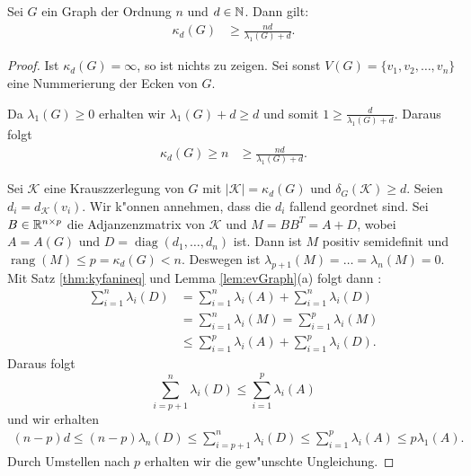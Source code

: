 \begin{theorem}
  Sei $G$ ein Graph der Ordnung $n$ und $d\in {\mathbb{N}}$. Dann gilt:
  \begin{align*}
    \kappa_{d}(G) &\geq \frac{nd}{\lambda_{1}(G) +d}.
  \end{align*}
  \label{thm:kappaineq1}
\end{theorem}

\begin{proof}
  Ist $\kappa_{d}(G) = \infty$, so ist nichts zu zeigen. Sei sonst $V(G) = \{v_1,v_2,\dots, v_n\}$ eine Nummerierung der Ecken von $G$.  

   Da $\lambda_{1}(G) \geq 0$ erhalten wir $\lambda_{1}(G) + d \geq d$ und somit $1\geq \frac{d}{\lambda_{1}(G) +d}$. Daraus folgt 
  \begin{align*}
    \kappa_{d}(G) \geq n &\geq \frac{nd}{\lambda_{1}(G)+d}.
  \end{align*}

  Sei $\mathcal{K}$ eine Krauszzerlegung von $G$ mit $|\mathcal{K}| = \kappa_{d}(G)$ und $\delta_{G}(\mathcal{K}) \geq d$. Seien $d_{i} = d_{\mathcal{K}}(v_i)$. Wir k"onnen annehmen, dass die $d_{i}$ fallend geordnet sind. Sei $B\in {\mathbb{R}}^{n\times p}$ die Adjanzenzmatrix von $\mathcal{K}$ und $M = BB^{T} = A+D$, wobei $A= A(G)$ und $D = \operatorname{diag}(d_{1},\dots,d_n)$ ist.
  Dann ist $M$ positiv semidefinit und $\operatorname{rang} (M) \leq p = \kappa_{d}(G) < n $. Deswegen ist $\lambda_{p+1}(M) = \dots =\lambda_{n}(M) = 0$. 
  Mit Satz \ref{thm:kyfanineq} und Lemma \ref{lem:evGraph}(a) folgt dann : 
  \begin{align*}
    \sum\limits_{i=1}^{n} \lambda_{i}(D) &=\sum\limits_{i=1}^{n} \lambda_{i}(A) +\sum\limits_{i=1}^{n}  \lambda_{i}(D) \\
    &=\sum\limits_{i=1}^{n} \lambda_{i}(M) =\sum\limits_{i=1}^{p} \lambda_{i}(M) \\
    &\leq \sum\limits_{i=1}^{p} \lambda_{i}(A) +\sum\limits_{i=1}^{p} \lambda_{i}(D).
  \end{align*}
  Daraus folgt 
  $$\sum\limits_{i=p+1}^{n} \lambda_{i}(D) \leq\sum\limits_{i=1}^{p} \lambda_{i}(A)$$ und wir erhalten
  \begin{align*}
    (n-p) d \leq (n-p) \lambda_n(D) \leq \sum\limits_{i=p+1}^{n} \lambda_{i}(D) \leq\sum\limits_{i=1}^{p} \lambda_{i}(A) \leq p\lambda_{1}(A).
  \end{align*}
  Durch Umstellen nach $p$ erhalten wir die gew"unschte Ungleichung.
\end{proof}

